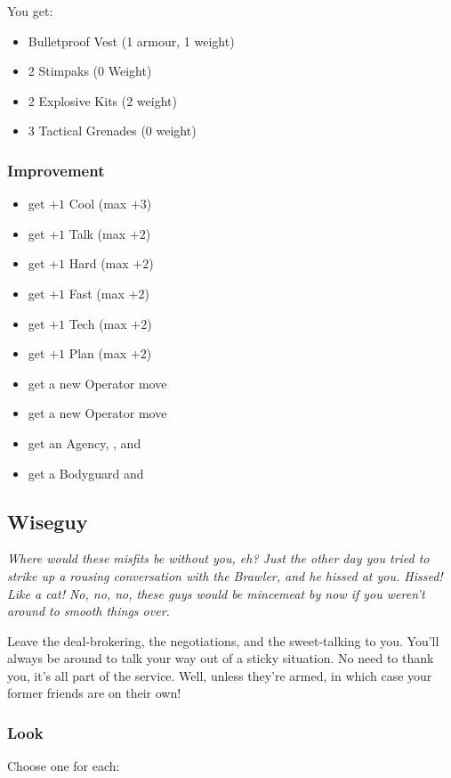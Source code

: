 You get:
\begin{itemize}
\item Bulletproof Vest (1 armour, 1 weight)
\item 2 Stimpaks (0 Weight)
\item 2 Explosive Kits (2 weight)
\item 3 Tactical Grenades (0 weight)
\end{itemize}

\subsubsection{Improvement}
\begin{itemize}
\item get $+1$ Cool (max $+3$)
\item get $+1$ Talk (max $+2$)
\item get $+1$ Hard (max $+2$)
\item get $+1$ Fast (max $+2$)
\item get $+1$ Tech (max $+2$)
\item get $+1$ Plan (max $+2$)
\item get a new Operator move
\item get a new Operator move
\item get an Agency, , and 
\item get a Bodyguard and 
\end{itemize}



\subsection{Wiseguy}
{\itshape Where would these misfits be without you, eh? Just the other
  day you tried to strike up a rousing conversation with the Brawler,
  and he \emph{hissed} at you. Hissed! Like a cat! No, no, no, these
  guys would be mincemeat by now if you weren't around to smooth
  things over.

Leave the deal-brokering, the negotiations, and the sweet-talking to
you. You'll always be around to talk your way out of a sticky
situation. No need to thank you, it's all part of the service. Well,
unless they're armed, in which case your former friends are on their
own!}
\subsubsection{Look}
Choose one for each:

